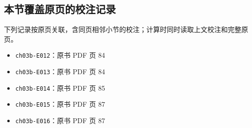 \documentclass[
  10pt,
  fontset=fandol]{ctexart}
\providecommand{\tightlist}{%
  \setlength{\itemsep}{0pt}\setlength{\parskip}{0pt}}
\begin{document}
\subsection{本节覆盖原页的校注记录}\label{ux672cux8282ux8986ux76d6ux539fux9875ux7684ux6821ux6ce8ux8bb0ux5f55}

下列记录按原页关联，含同页相邻小节的校注；计算时同时读取上文校注和完整原页。

\begin{itemize}
\tightlist
\item
  \texttt{ch03b-E012}：原书 PDF 页 84
\item
  \texttt{ch03b-E013}：原书 PDF 页 84
\item
  \texttt{ch03b-E014}：原书 PDF 页 85
\item
  \texttt{ch03b-E015}：原书 PDF 页 87
\item
  \texttt{ch03b-E016}：原书 PDF 页 87
\end{itemize}
\end{document}
